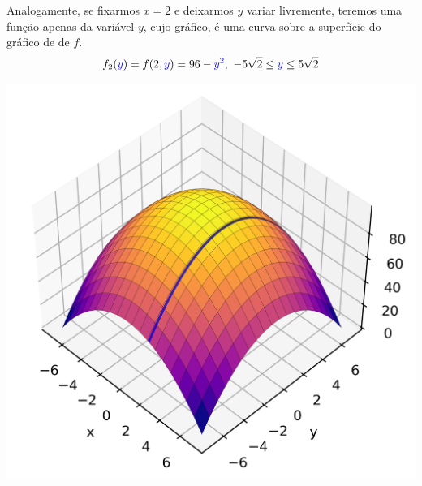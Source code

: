 \begin{frame}
	Analogamente, se fixarmos $x=2$ e deixarmos {\color{blue}$y$} variar livremente, teremos uma função apenas da variável {\color{blue}$y$}, cujo gráfico, é uma curva sobre a superfície do gráfico de de $f$.
	\[f_2({\color{blue}y})=f(2,{\color{blue}y})=96-{\color{blue}y^2}, \ -5\sqrt{2}\leq {\color{blue}y}\leq 5\sqrt{2} \]
	
	
	\begin{center}
		\includegraphics[scale=0.6]{figuras/der-parc2y-2.png}
	\end{center}
\end{frame}

